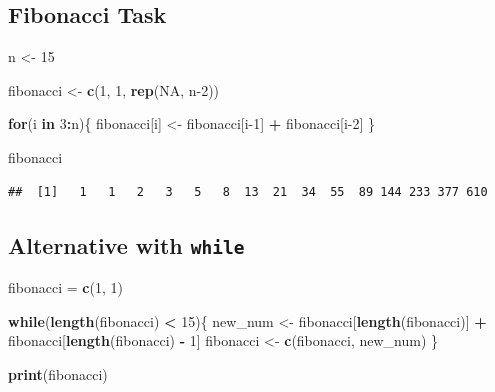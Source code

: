 \documentclass[
]{book}
\newenvironment{Shaded}{\begin{snugshade}}{\end{snugshade}}
\newcommand{\ConstantTok}[1]{\textcolor[rgb]{0.56,0.35,0.01}{#1}}
\newcommand{\ControlFlowTok}[1]{\textcolor[rgb]{0.13,0.29,0.53}{\textbf{#1}}}
\newcommand{\DecValTok}[1]{\textcolor[rgb]{0.00,0.00,0.81}{#1}}
\newcommand{\FunctionTok}[1]{\textcolor[rgb]{0.13,0.29,0.53}{\textbf{#1}}}
\newcommand{\NormalTok}[1]{#1}
\newcommand{\OtherTok}[1]{\textcolor[rgb]{0.56,0.35,0.01}{#1}}
\newcommand{\SpecialCharTok}[1]{\textcolor[rgb]{0.81,0.36,0.00}{\textbf{#1}}}
\begin{document}
\subsection{Fibonacci Task}\label{fibonacci-task-1}

\begin{Shaded}
\begin{Highlighting}[]
\NormalTok{n }\OtherTok{\textless{}{-}} \DecValTok{15}

\NormalTok{fibonacci }\OtherTok{\textless{}{-}} \FunctionTok{c}\NormalTok{(}\DecValTok{1}\NormalTok{, }\DecValTok{1}\NormalTok{, }\FunctionTok{rep}\NormalTok{(}\ConstantTok{NA}\NormalTok{, n}\DecValTok{{-}2}\NormalTok{))}

\ControlFlowTok{for}\NormalTok{(i }\ControlFlowTok{in} \DecValTok{3}\SpecialCharTok{:}\NormalTok{n)\{}
\NormalTok{  fibonacci[i] }\OtherTok{\textless{}{-}}\NormalTok{ fibonacci[i}\DecValTok{{-}1}\NormalTok{] }\SpecialCharTok{+}\NormalTok{ fibonacci[i}\DecValTok{{-}2}\NormalTok{]}
\NormalTok{\}}

\NormalTok{fibonacci}
\end{Highlighting}
\end{Shaded}

\begin{verbatim}
##  [1]   1   1   2   3   5   8  13  21  34  55  89 144 233 377 610
\end{verbatim}

\subsection{\texorpdfstring{Alternative with \texttt{while}}{Alternative with while}}\label{alternative-with-while}

\begin{Shaded}
\begin{Highlighting}[]
\NormalTok{fibonacci }\OtherTok{=} \FunctionTok{c}\NormalTok{(}\DecValTok{1}\NormalTok{, }\DecValTok{1}\NormalTok{)}


\ControlFlowTok{while}\NormalTok{(}\FunctionTok{length}\NormalTok{(fibonacci) }\SpecialCharTok{\textless{}} \DecValTok{15}\NormalTok{)\{}
\NormalTok{  new\_num }\OtherTok{\textless{}{-}}\NormalTok{ fibonacci[}\FunctionTok{length}\NormalTok{(fibonacci)] }\SpecialCharTok{+}\NormalTok{ fibonacci[}\FunctionTok{length}\NormalTok{(fibonacci) }\SpecialCharTok{{-}} \DecValTok{1}\NormalTok{]}
\NormalTok{  fibonacci }\OtherTok{\textless{}{-}} \FunctionTok{c}\NormalTok{(fibonacci, new\_num)}
\NormalTok{\}}

\FunctionTok{print}\NormalTok{(fibonacci)}
\end{Highlighting}
\end{Shaded}
\end{document}
